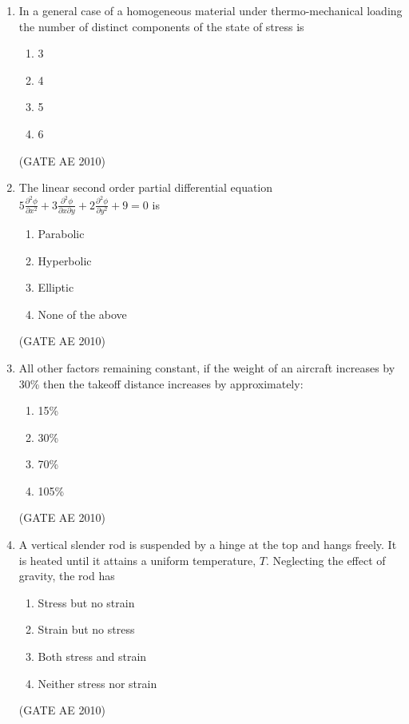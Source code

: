 \documentclass[journal]{IEEEtran}
\begin{document}
\begin{enumerate}
\item In a general case of a homogeneous material under thermo-mechanical loading the number of distinct components of the state of stress is
\begin{multicols}{4}
\begin{enumerate}
\item 3
\item 4
\item 5
\item 6
\end{enumerate}
\end{multicols}
\hfill (GATE AE 2010)

\item The linear second order partial differential equation $ 5 \frac{\partial^2 \phi}{\partial x^2} + 3 \frac{\partial^2 \phi}{\partial x \partial y} + 2 \frac{\partial^2 \phi}{\partial y^2} + 9 = 0 $ is
\begin{multicols}{2}
\begin{enumerate}
\item Parabolic
\item Hyperbolic
\item Elliptic
\item None of the above
\end{enumerate}
\end{multicols}
\hfill (GATE AE 2010)

\item All other factors remaining constant, if the weight of an aircraft increases by 30\% then the takeoff distance increases by approximately:
\begin{multicols}{4}
\begin{enumerate}
\item 15\%
\item 30\%
\item 70\%
\item 105\%
\end{enumerate}
\end{multicols}
\hfill (GATE AE 2010)

\item A vertical slender rod is suspended by a hinge at the top and hangs freely. It is heated until it attains a uniform temperature, $ T $. Neglecting the effect of gravity, the rod has
\begin{multicols}{2}
\begin{enumerate}
\item Stress but no strain
\item Strain but no stress
\item Both stress and strain
\item Neither stress nor strain
\end{enumerate}
\end{multicols}
\hfill (GATE AE 2010)


\end{enumerate}
\end{document}
